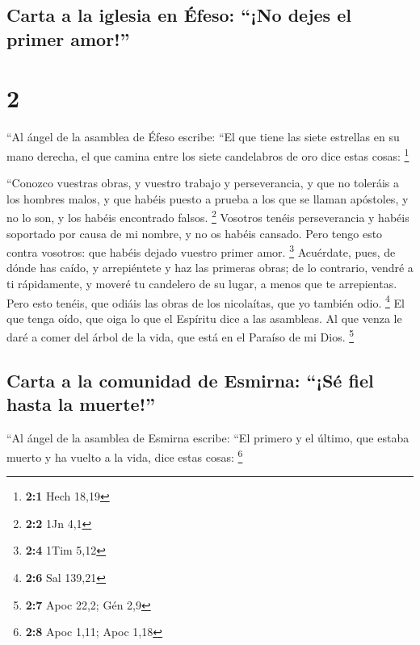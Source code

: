 \hypertarget{carta-a-la-iglesia-en-uxe9feso-no-dejes-el-primer-amor}{%
\subsection{Carta a la iglesia en Éfeso: ``¡No dejes el primer
amor!''}\label{carta-a-la-iglesia-en-uxe9feso-no-dejes-el-primer-amor}}

\hypertarget{section-1}{%
\section{2}\label{section-1}}

 ``Al ángel de la asamblea de Éfeso escribe: ``El que
tiene las siete estrellas en su mano derecha, el que camina entre los
siete candelabros de oro dice estas cosas: \footnote{\textbf{2:1} Hech
  18,19}

 ``Conozco vuestras obras, y vuestro trabajo y
perseverancia, y que no toleráis a los hombres malos, y que habéis
puesto a prueba a los que se llaman apóstoles, y no lo son, y los habéis
encontrado falsos. \footnote{\textbf{2:2} 1Jn 4,1} 
Vosotros tenéis perseverancia y habéis soportado por causa de mi nombre,
y no os habéis cansado.  Pero tengo esto contra vosotros:
que habéis dejado vuestro primer amor. \footnote{\textbf{2:4} 1Tim 5,12}
 Acuérdate, pues, de dónde has caído, y arrepiéntete y haz
las primeras obras; de lo contrario, vendré a ti rápidamente, y moveré
tu candelero de su lugar, a menos que te arrepientas. 
Pero esto tenéis, que odiáis las obras de los nicolaítas, que yo también
odio. \footnote{\textbf{2:6} Sal 139,21}  El que tenga
oído, que oiga lo que el Espíritu dice a las asambleas. Al que venza le
daré a comer del árbol de la vida, que está en el Paraíso de mi Dios.
\footnote{\textbf{2:7} Apoc 22,2; Gén 2,9}

\hypertarget{carta-a-la-comunidad-de-esmirna-suxe9-fiel-hasta-la-muerte}{%
\subsection{Carta a la comunidad de Esmirna: ``¡Sé fiel hasta la
muerte!''}\label{carta-a-la-comunidad-de-esmirna-suxe9-fiel-hasta-la-muerte}}

 ``Al ángel de la asamblea de Esmirna escribe: ``El
primero y el último, que estaba muerto y ha vuelto a la vida, dice estas
cosas: \footnote{\textbf{2:8} Apoc 1,11; Apoc 1,18}

